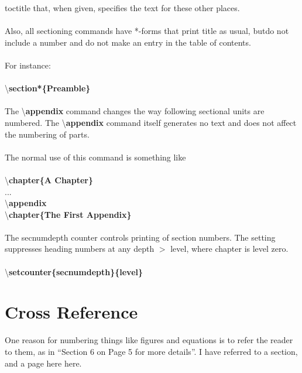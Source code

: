 \documentclass[12pt, a4paper]{article}
\newcommand*{\qcr}{\fontfamily{qcr}\selectfont}
\begin{document}
toctitle that, when given, specifies the text for these other places.
\\~\\
\hspace{0.5cm}Also, all sectioning commands have *-forms that print title as usual,
butdo not include a number and do not make an entry in the table of
contents.
\\~\\
\hspace*{0.5cm}For instance:
\\~\\
\hspace*{2cm}\textbackslash{}\textbf{\qcr \large section*\{Preamble\}}
\\~\\
\hspace*{0.5cm}The \textbackslash{}\textbf{appendix} command changes the way following sectional units
are numbered. The \textbackslash{}\textbf{appendix} command itself generates no text and
does not affect the numbering of parts.
\\~\\
\hspace*{0.5cm}The normal use of this command is something like
\\~\\
{\qcr \large
\hspace*{2cm}\textbackslash{}\textbf{chapter\{A Chapter\}}
\\
\hspace*{2cm}...
\\
\hspace*{2cm}\textbackslash{}\textbf{appendix}
\\
\hspace*{2cm}\textbackslash{}\textbf{chapter\{The First Appendix\}}
}
\\~\\
\hspace{0.5cm}The secnumdepth counter controls printing of section numbers. The
setting suppresses heading numbers at any depth $>$ level, where chapter is level zero.
\\~\\
\hspace*{2cm}\textbackslash{}\textbf{\qcr \large setcounter\{secnumdepth\}\{level\}}

\section{Cross Reference}
One reason for numbering things like figures and equations is to refer
the reader to them, as in “Section 6 on Page 5 for more details”. {\Large I
have referred to a section, and a page here here.}
\end{document}
